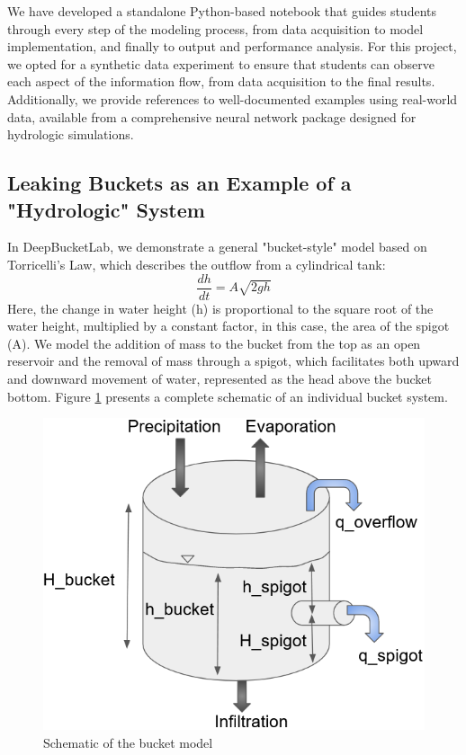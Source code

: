 \documentclass{article}
\begin{document}
We have developed a standalone Python-based notebook that guides students through every step of the modeling process, from data acquisition to model implementation, and finally to output and performance analysis. For this project, we opted for a synthetic data experiment to ensure that students can observe each aspect of the information flow, from data acquisition to the final results. Additionally, we provide references to well-documented examples using real-world data, available from a comprehensive neural network package designed for hydrologic simulations.

\subsection{Leaking Buckets as an Example of a "Hydrologic" System}
In DeepBucketLab, we demonstrate a general "bucket-style" model based on Torricelli's Law, which describes the outflow from a cylindrical tank:
\begin{equation}
\label{eq:torr}
\frac{dh}{dt} = A\sqrt{2gh}
\end{equation}
Here, the change in water height (h) is proportional to the square root of the water height, multiplied by a constant factor, in this case, the area of the spigot (A). We model the addition of mass to the bucket from the top as an open reservoir and the removal of mass through a spigot, which facilitates both upward and downward movement of water, represented as the head above the bucket bottom. Figure \ref{fig:schematic} presents a complete schematic of an individual bucket system.

\begin{figure}[h]
\centering
\includegraphics[width=\textwidth]{figures/bucket_schematic.png}
\caption{Schematic of the bucket model}
\label{fig:schematic}
\end{figure}
\end{document}
